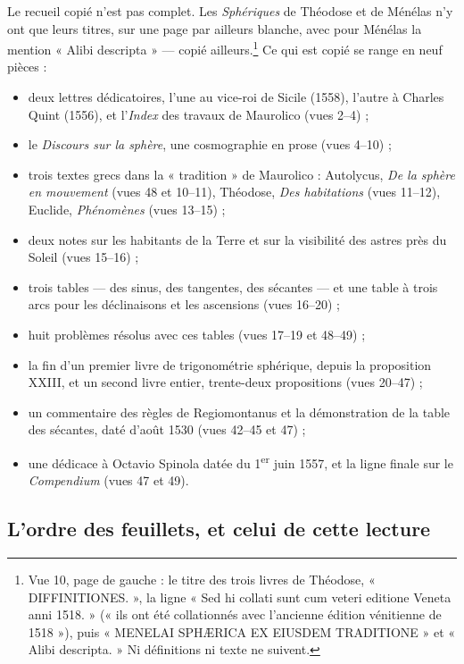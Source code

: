 \documentclass[11pt,a4paper]{article}
\begin{document}
Le recueil copié n'est pas complet. Les \emph{Sphériques} de Théodose et de
Ménélas n'y ont que leurs titres, sur une page par ailleurs blanche, avec pour
Ménélas la mention « Alibi descripta » — copié ailleurs.\footnote{Vue 10, page de
gauche : le titre des trois livres de Théodose, « DIFFINITIONES. », la ligne
« Sed hi collati sunt cum veteri editione Veneta anni 1518. » (« ils ont été
collationnés avec l'ancienne édition vénitienne de 1518 »), puis « MENELAI
SPHÆRICA EX EIUSDEM TRADITIONE » et « Alibi descripta. » Ni définitions ni
texte ne suivent.} Ce qui est copié se range en neuf pièces :

\begin{itemize}
  \item deux lettres dédicatoires, l'une au vice-roi de Sicile (1558), l'autre
    à Charles Quint (1556), et l'\emph{Index} des travaux de Maurolico
    (vues 2--4) ;
  \item le \emph{Discours sur la sphère}, une cosmographie en prose
    (vues 4--10) ;
  \item trois textes grecs dans la « tradition » de Maurolico : Autolycus,
    \emph{De la sphère en mouvement} (vues 48 et 10--11), Théodose,
    \emph{Des habitations} (vues 11--12), Euclide, \emph{Phénomènes}
    (vues 13--15) ;
  \item deux notes sur les habitants de la Terre et sur la visibilité des
    astres près du Soleil (vues 15--16) ;
  \item trois tables — des sinus, des tangentes, des sécantes — et une table
    à trois arcs pour les déclinaisons et les ascensions (vues 16--20) ;
  \item huit problèmes résolus avec ces tables (vues 17--19 et 48--49) ;
  \item la fin d'un premier livre de trigonométrie sphérique, depuis la
    proposition XXIII, et un second livre entier, trente-deux propositions
    (vues 20--47) ;
  \item un commentaire des règles de Regiomontanus et la démonstration de la
    table des sécantes, daté d'août 1530 (vues 42--45 et 47) ;
  \item une dédicace à Octavio Spinola datée du 1\textsuperscript{er} juin 1557,
    et la ligne finale sur le \emph{Compendium} (vues 47 et 49).
\end{itemize}

\subsection*{L'ordre des feuillets, et celui de cette lecture}
\end{document}
